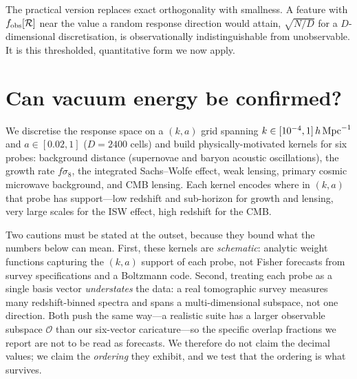 \documentclass[twocolumn,10pt]{article}
\newcommand{\obs}{f_{\rm obs}}
\begin{document}
The practical version replaces exact orthogonality with smallness. A feature
with $\obs[\mathcal{R}]$ near the value a random response direction would
attain, $\sqrt{N/D}$ for a $D$-dimensional discretisation, is observationally
indistinguishable from unobservable. It is this thresholded, quantitative form
we now apply.

\section{Can vacuum energy be confirmed?}
\label{sec:lambda}

We discretise the response space on a $(k,a)$ grid spanning
$k\in[10^{-4},1]\,h\,{\rm Mpc}^{-1}$ and $a\in[0.02,1]$ ($D=2400$ cells) and
build physically-motivated kernels for six probes: background distance
(supernovae and baryon acoustic oscillations), the growth rate $f\sigma_8$, the
integrated Sachs--Wolfe effect, weak lensing, primary cosmic microwave
background, and CMB lensing. Each kernel encodes where in $(k,a)$ that probe has
support---low redshift and sub-horizon for growth and lensing, very large scales
for the ISW effect, high redshift for the CMB.

Two cautions must be stated at the outset, because they bound what the numbers
below can mean. First, these kernels are \emph{schematic}: analytic weight
functions capturing the $(k,a)$ support of each probe, not Fisher forecasts from
survey specifications and a Boltzmann code. Second, treating each probe as a
single basis vector \emph{understates} the data: a real tomographic survey
measures many redshift-binned spectra and spans a multi-dimensional subspace,
not one direction. Both push the same way---a realistic suite has a larger
observable subspace $\mathcal{O}$ than our six-vector caricature---so the
specific overlap fractions we report are not to be read as forecasts. We
therefore do not claim the decimal values; we claim the \emph{ordering} they
exhibit, and we test that the ordering is what survives.
\end{document}
